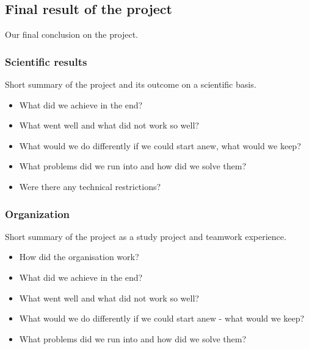 \subsection{Final result of the project}

Our final conclusion on the project.


\subsubsection{Scientific results}

Short summary of the project and its outcome on a scientific basis.

\begin{itemize}
\item What did we achieve in the end?
\item What went well and what did not work so well?
\item What would we do differently if we could start anew, what would we keep?
\item What problems did we run into and how did we solve them?
\item Were there any technical restrictions?
\end{itemize}


\subsubsection{Organization}

Short summary of the project as a study project and teamwork experience.

\begin{itemize}
\item How did the organisation work?
\item What did we achieve in the end?
\item What went well and what did not work so well?
\item What would we do differently if we could start anew - what would we keep?
\item What problems did we run into and how did we solve them?
\end{itemize}

